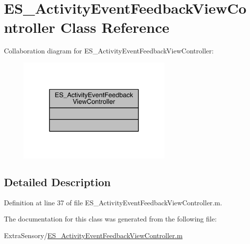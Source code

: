 \hypertarget{class_e_s___activity_event_feedback_view_controller}{\section{E\+S\+\_\+\+Activity\+Event\+Feedback\+View\+Controller Class Reference}
\label{class_e_s___activity_event_feedback_view_controller}
}


Collaboration diagram for E\+S\+\_\+\+Activity\+Event\+Feedback\+View\+Controller\+:\nopagebreak
\begin{figure}[H]
\begin{center}
\leavevmode
\includegraphics[width=216pt]{d3/d4e/class_e_s___activity_event_feedback_view_controller__coll__graph}
\end{center}
\end{figure}


\subsection{Detailed Description}


Definition at line 37 of file E\+S\+\_\+\+Activity\+Event\+Feedback\+View\+Controller.\+m.



The documentation for this class was generated from the following file\+:\begin{DoxyCompactItemize}
\item 
Extra\+Sensory/\hyperlink{_e_s___activity_event_feedback_view_controller_8m}{E\+S\+\_\+\+Activity\+Event\+Feedback\+View\+Controller.\+m}\end{DoxyCompactItemize}
